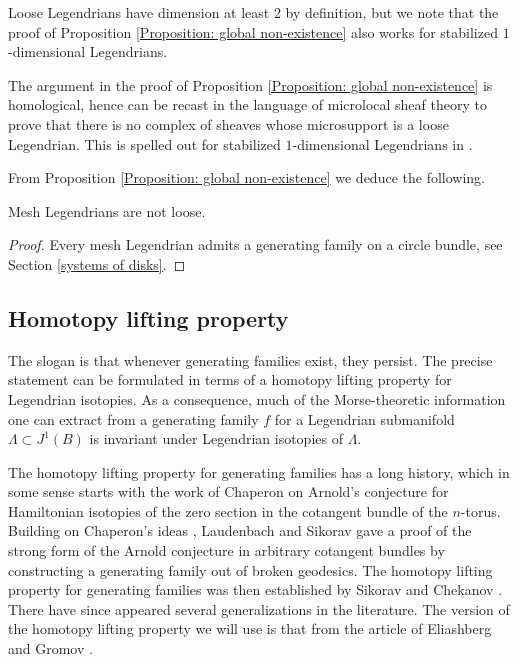 \begin{remark}
Loose Legendrians have dimension at least 2 by definition, but we note that the proof of Proposition \ref{Proposition: global non-existence} also works for stabilized $1$-dimensional Legendrians.
\end{remark}

\begin{remark}
The argument in the proof of Proposition \ref{Proposition: global non-existence} is homological, hence can be recast in the language of microlocal sheaf theory to prove that there is no complex of sheaves whose microsupport is a loose Legendrian. This is spelled out for stabilized $1$-dimensional Legendrians in \cite{STZ17}.
\end{remark}

From Proposition \ref{Proposition: global non-existence} we deduce the following.

\begin{corollary}
Mesh Legendrians are not loose.
\end{corollary}
\begin{proof} Every mesh Legendrian admits a generating family on a circle bundle, see Section \ref{systems of disks}.\end{proof}

\subsection{Homotopy lifting property}

The slogan is that whenever generating families exist, they persist. The precise statement can be formulated in terms of a homotopy lifting property for Legendrian isotopies. As a consequence, much of the Morse-theoretic information one can extract from a generating family $f$ for a Legendrian submanifold $\Lambda \subset J^1(B)$ is invariant under Legendrian isotopies of $\Lambda$.

The homotopy lifting property for generating families has a long history, which in some sense starts with the work of Chaperon on Arnold's conjecture for Hamiltonian isotopies of the zero section in the cotangent bundle of the $n$-torus. Building on Chaperon's ideas \cite{C84}, Laudenbach and Sikorav gave a proof of the strong form of the Arnold conjecture in arbitrary cotangent bundles \cite{LS85} by constructing a generating family out of broken geodesics. The homotopy lifting property for generating families was then established by Sikorav \cite{S86} and Chekanov \cite{C96}. There have since appeared several generalizations in the literature. The version of the homotopy lifting property we will use is that from the article of Eliashberg and Gromov \cite{EG98}.

